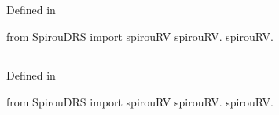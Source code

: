 \begin{minipage}{\textwidth}
\subsection{}

Defined in \spirouRV{}

\begin{pythonbox}
from SpirouDRS import spirouRV
spirouRV.
spirouRV.
\end{pythonbox}

\begin{pythondocstring}

\end{pythondocstring}
\end{minipage}

\begin{minipage}{\textwidth}
\subsection{}

Defined in \spirouRV{}

\begin{pythonbox}
from SpirouDRS import spirouRV
spirouRV.
spirouRV.
\end{pythonbox}

\begin{pythondocstring}

\end{pythondocstring}
\end{minipage}


